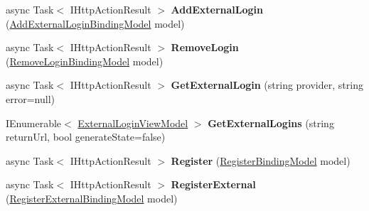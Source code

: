 \begin{DoxyCompactItemize}
\item 
\hypertarget{class_wis_r_rest_a_p_i_1_1_controllers_1_1_account_controller_ac7d34a0dc82e3c0e6fde0efc87c92c21}{}async Task$<$ I\+Http\+Action\+Result $>$ {\bfseries Add\+External\+Login} (\hyperlink{class_wis_r_rest_a_p_i_1_1_models_1_1_add_external_login_binding_model}{Add\+External\+Login\+Binding\+Model} model)\label{class_wis_r_rest_a_p_i_1_1_controllers_1_1_account_controller_ac7d34a0dc82e3c0e6fde0efc87c92c21}

\item 
\hypertarget{class_wis_r_rest_a_p_i_1_1_controllers_1_1_account_controller_aafed507b4dad410d4a012d2ca9ae7046}{}async Task$<$ I\+Http\+Action\+Result $>$ {\bfseries Remove\+Login} (\hyperlink{class_wis_r_rest_a_p_i_1_1_models_1_1_remove_login_binding_model}{Remove\+Login\+Binding\+Model} model)\label{class_wis_r_rest_a_p_i_1_1_controllers_1_1_account_controller_aafed507b4dad410d4a012d2ca9ae7046}

\item 
\hypertarget{class_wis_r_rest_a_p_i_1_1_controllers_1_1_account_controller_aacc7208945532a6cb1c69a889765f924}{}async Task$<$ I\+Http\+Action\+Result $>$ {\bfseries Get\+External\+Login} (string provider, string error=null)\label{class_wis_r_rest_a_p_i_1_1_controllers_1_1_account_controller_aacc7208945532a6cb1c69a889765f924}

\item 
\hypertarget{class_wis_r_rest_a_p_i_1_1_controllers_1_1_account_controller_ac8aa5eba006804766fe6ec9ca064083e}{}I\+Enumerable$<$ \hyperlink{class_wis_r_rest_a_p_i_1_1_models_1_1_external_login_view_model}{External\+Login\+View\+Model} $>$ {\bfseries Get\+External\+Logins} (string return\+Url, bool generate\+State=false)\label{class_wis_r_rest_a_p_i_1_1_controllers_1_1_account_controller_ac8aa5eba006804766fe6ec9ca064083e}

\item 
\hypertarget{class_wis_r_rest_a_p_i_1_1_controllers_1_1_account_controller_ad189b1fc7ae2f4674ec111bfffc6a8a3}{}async Task$<$ I\+Http\+Action\+Result $>$ {\bfseries Register} (\hyperlink{class_wis_r_rest_a_p_i_1_1_models_1_1_register_binding_model}{Register\+Binding\+Model} model)\label{class_wis_r_rest_a_p_i_1_1_controllers_1_1_account_controller_ad189b1fc7ae2f4674ec111bfffc6a8a3}

\item 
\hypertarget{class_wis_r_rest_a_p_i_1_1_controllers_1_1_account_controller_a0039f4ed5f79d918ab1c76af6535d742}{}async Task$<$ I\+Http\+Action\+Result $>$ {\bfseries Register\+External} (\hyperlink{class_wis_r_rest_a_p_i_1_1_models_1_1_register_external_binding_model}{Register\+External\+Binding\+Model} model)\label{class_wis_r_rest_a_p_i_1_1_controllers_1_1_account_controller_a0039f4ed5f79d918ab1c76af6535d742}

\end{DoxyCompactItemize}
